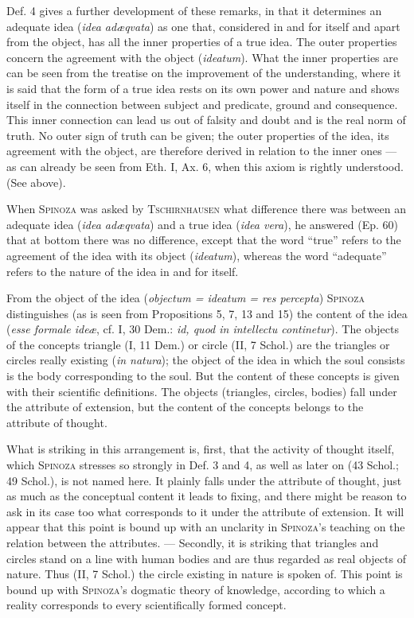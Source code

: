 \documentclass[12pt]{article}
\newcommand{\opage}[1]{\marginnote{\footnotesize\textit{[#1]}}}
\begin{document}
Def. 4 gives a further development of these remarks, in that it determines an adequate
idea (\textit{idea adæqvata}) as one that, considered in and for itself and apart from
the object, has all the inner properties of a true idea. The outer properties concern the
agreement with the object (\textit{ideatum}). What the inner properties are can be seen
from the treatise on the improvement of the understanding, where it is said that the form
of a true idea rests on its own power and nature and shows itself in the connection
between subject and predicate, ground and consequence. This inner connection can lead us
out of falsity and doubt and is the real norm of truth. No outer sign of truth can be
given; the outer properties of the idea, its agreement with the object, are therefore
derived in relation to the inner ones --- as can already be seen from Eth. I, Ax. 6, when
this axiom is rightly understood. (See above).

When \textsc{Spinoza} was asked by \textsc{Tschirnhausen} what difference there was between
an adequate idea (\textit{idea adæqvata}) and a true idea (\textit{idea vera}), he
answered (Ep. 60) that at bottom there was no difference, except that the word ``true''
refers to the agreement of the idea with its object (\textit{ideatum}), whereas the word
``adequate'' refers to the nature of the idea in and for itself.

From the object of the idea (\textit{objectum = ideatum = res percepta}) \textsc{Spinoza}
distinguishes (as is seen from Propositions 5, 7, 13 and 15) the content of the idea
(\textit{esse formale ideæ}, \opage{37}cf. I, 30 Dem.: \textit{id, quod in intellectu
continetur}). The objects of the concepts triangle (I, 11 Dem.) or circle (II, 7 Schol.)
are the triangles or circles really existing (\textit{in natura}); the object of the idea
in which the soul consists is the body corresponding to the soul. But the content of these
concepts is given with their scientific definitions. The objects (triangles, circles,
bodies) fall under the attribute of extension, but the content of the concepts belongs to
the attribute of thought.

What is striking in this arrangement is, first, that the activity of thought itself, which
\textsc{Spinoza} stresses so strongly in Def. 3 and 4, as well as later on (43 Schol.; 49
Schol.), is not named here. It plainly falls under the attribute of thought, just as much
as the conceptual content it leads to fixing, and there might be reason to ask in its case %
too what corresponds to it under the attribute of extension. It will appear that this point
is bound up with an unclarity in \textsc{Spinoza}'s teaching on the relation between the
attributes. --- Secondly, it is striking that triangles and circles stand on a line with
human bodies and are thus regarded as real objects of nature. Thus (II, 7 Schol.) the
circle existing in nature is spoken of. This point is bound up with \textsc{Spinoza}'s
dogmatic theory of knowledge, according to which a reality corresponds to every
scientifically formed concept.
\end{document}

